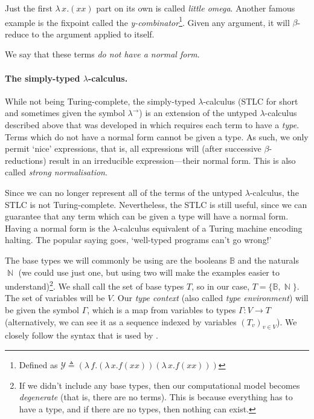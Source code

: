 \documentclass[logo,bsc,singlespacing,parskip,online]{infthesis}
\DeclareMathOperator{\nat}{\mathbb{N}}
\begin{document}
Just the first $\lambda \, x. (x x)$ part on its own is called \textit{little
omega}. Another famous example is the fixpoint called the
\textit{y-combinator}\footnote{Defined as $\mathcal{Y} \triangleq (\lambda \, f.
(\lambda \, x. f (x x )) (\lambda \, x. f (xx)))$}. Given any argument, it will
$\beta$-reduce to the argument applied to itself.

We say that these terms \textit{do not have a normal form}.

\paragraph*{The simply-typed $\lambda$-calculus.} While not being
Turing-complete, the simply-typed $\lambda$-calculus (STLC for short and
sometimes given the symbol $\lambda^{\rightarrow}$) is an extension of the
untyped $\lambda$-calculus described above that was developed in
\citet{church_formulation_1940} which requires each term to have a
\textit{type}. Terms which do not have a normal form cannot be given a type. As
such, we only permit `nice' expressions, that is, all expressions will (after
successive $\beta$-reductions) result in an irreducible expression---their
normal form. This is also called \textit{strong normalisation}.
\citep{pierce_types_2002}

Since we can no longer represent all of the terms of the untyped
$\lambda$-calculus, the STLC is not Turing-complete. Nevertheless, the STLC is
still useful, since we can guarantee that any term which can be given a type
will have a normal form. Having a normal form is the $\lambda$-calculus
equivalent of a Turing machine encoding halting. The popular saying goes,
`well-typed programs can't go wrong!' \citep{milner_theory_1978}

The base types we will commonly be using are the booleans $\mathbb{B}$ and the
naturals $\nat$ (we could use just one, but using two will make the examples
easier to understand)\footnote{If we didn't include any base types, then our
computational model becomes \textit{degenerate} (that is, there are no terms).
This is because everything has to have a type, and if there are no types, then
nothing can exist.}. We shall call the set of base types $T$, so in our case, $T
= \{ \mathbb{B} , \nat \}$. The set of variables will be $V$. Our \textit{type
context} (also called \textit{type environment}) will be given the symbol
$\Gamma$, which is a map from variables to types $\Gamma \colon V \to T$
(alternatively, we can see it as a sequence indexed by variables $(T_v)_{v \in
V}$). We closely follow the syntax that is used by \citet{pierce_types_2002}.
\end{document}
